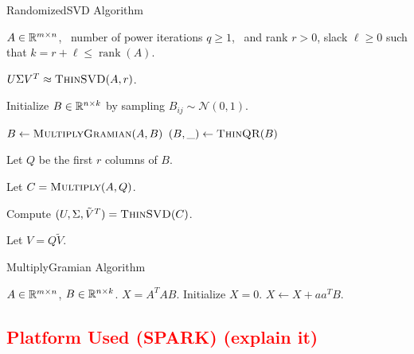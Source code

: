 \begin{algorithm}[tb]
 \caption{{\sc RandomizedSVD} Algorithm}
  \label{alg:rsvd}
  \begin{algorithmic}[1]
    \Require $A \in \mathbb{R}^{m\times n}$, \
      number of power iterations $q \ge 1$, \
      and rank $r > 0$, slack $\ell \ge 0$ such that $k=r+\ell \leq \operatorname{rank}(A)$.

    \Ensure $U \Sigma V^T \approx \Call{ThinSVD}{A, r}$.

    \State Initialize $B \in \mathbb{R}^{n\times k}$ by sampling $B_{ij} \sim \mathcal{N}(0, 1)$.

    \For{$q$ times}
        \State $B \gets \Call{MultiplyGramian}{A, B}$
        \State $(B, \_) \gets \Call{ThinQR}{B}$
    \EndFor

    \State Let $Q$ be the first $r$ columns of $B$.

    \State Let $C = \Call{Multiply}{A, Q}$.

    \State Compute $(U, \Sigma, \tilde V^T) = \Call{ThinSVD}{C}$.

    \State Let $V = Q \tilde V$.

    \end{algorithmic}
\end{algorithm}

\begin{algorithm}[tb]
  \caption{{\sc MultiplyGramian} Algorithm}
  \label{alg:gram}
  \begin{algorithmic}[1]
    \Require $A \in \mathbb{R}^{m\times n}$, $B \in \mathbb{R}^{n\times k}$.
    \Ensure $X = A^T A B$.
    \State Initialize $X = 0$.
        \State $X \gets X + a a^T B$.
    \EndFor
  \end{algorithmic}
\end{algorithm}

\textcolor{red}{
\subsection {Platform Used (SPARK) (explain it) }
}

